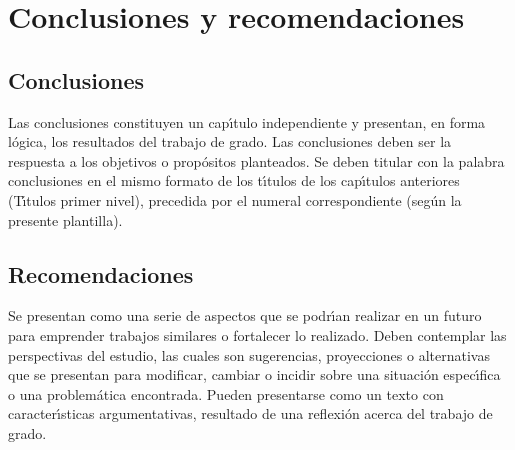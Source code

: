 \chapter{Conclusiones y recomendaciones}
\section{Conclusiones}
Las conclusiones constituyen un cap\'{\i}tulo independiente y presentan, en forma l\'{o}gica, los resultados del trabajo de grado. Las conclusiones deben ser la respuesta a los objetivos o prop\'{o}sitos planteados. Se deben titular con la palabra conclusiones en el mismo formato de los t\'{\i}tulos de los cap\'{\i}tulos anteriores (T\'{\i}tulos primer nivel), precedida por el numeral correspondiente (seg\'{u}n la presente plantilla).\\

\section{Recomendaciones}
Se presentan como una serie de aspectos que se podr\'{\i}an realizar en un futuro para emprender trabajos similares o fortalecer lo realizado. Deben contemplar las perspectivas del estudio, las cuales son sugerencias, proyecciones o alternativas que se presentan para modificar, cambiar o incidir sobre una situaci\'{o}n espec\'{\i}fica o una problem\'{a}tica encontrada. Pueden presentarse como un texto con caracter\'{\i}sticas argumentativas, resultado de una reflexi\'{o}n acerca del trabajo de grado.\\



